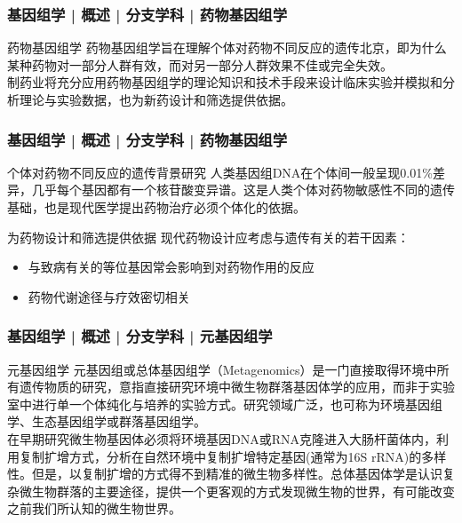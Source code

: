 \begin{frame}
  \frametitle{基因组学 | 概述 | 分支学科 | 药物基因组学}
  \begin{block}{药物基因组学}
药物基因组学旨在理解个体对药物不同反应的遗传北京，即为什么某种药物对一部分人群有效，而对另一部分人群效果不佳或完全失效。\\
\vspace{1em}
制药业将充分应用药物基因组学的理论知识和技术手段来设计临床实验并模拟和分析理论与实验数据，也为新药设计和筛选提供依据。
  \end{block}
\end{frame}

\begin{frame}
  \frametitle{基因组学 | 概述 | 分支学科 | 药物基因组学}
  \begin{block}{个体对药物不同反应的遗传背景研究}
人类基因组DNA在个体间一般呈现0.01\%差异，几乎每个基因都有一个核苷酸变异谱。这是人类个体对药物敏感性不同的遗传基础，也是现代医学提出药物治疗必须个体化的依据。
  \end{block}
  \pause
  \begin{block}{为药物设计和筛选提供依据}
现代药物设计应考虑与遗传有关的若干因素：
\begin{itemize}
  \item 与致病有关的等位基因常会影响到对药物作用的反应
  \item 药物代谢途径与疗效密切相关
\end{itemize}
  \end{block}
\end{frame}

\begin{frame}
  \frametitle{基因组学 | 概述 | 分支学科 | 元基因组学}
  \begin{block}{元基因组学}
元基因组或总体基因组学（Metagenomics）是一门直接取得环境中所有遗传物质的研究，意指直接研究环境中微生物群落基因体学的应用，而非于实验室中进行单一个体纯化与培养的实验方式。研究领域广泛，也可称为环境基因组学、生态基因组学或群落基因组学。\\
\vspace{1em}
在早期研究微生物基因体必须将环境基因DNA或RNA克隆进入大肠杆菌体内，利用复制扩增方式，分析在自然环境中复制扩增特定基因(通常为16S rRNA)的多样性。但是，以复制扩增的方式得不到精准的微生物多样性。总体基因体学是认识复杂微生物群落的主要途径，提供一个更客观的方式发现微生物的世界，有可能改变之前我们所认知的微生物世界。
  \end{block}
\end{frame}

